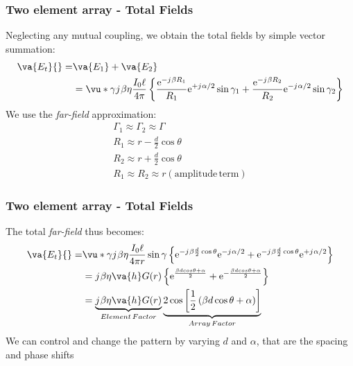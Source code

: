 \documentclass[10pt]{beamer}
\newcommand{\e}{\mathrm{e}} %
\renewcommand{\j}{{j}\mkern1mu} %
\begin{document}
\begin{frame}
    \frametitle{Two element array - Total Fields}
Neglecting any mutual coupling, we obtain the total fields by simple vector summation:
\begin{align*}
    \va{E_t} {}=& \va{E_1} + \va{E_2} \\
    &= \vu*{\gamma} \j \beta \eta \frac{I_{0} \ell}{4 \pi}\left\{\frac{\e^{-\j \beta R_{1}}}{R_{1}} \e^{+\j \alpha / 2} \sin \gamma_{1}+\frac{\e^{-\j \beta R_{2}}}{R_{2}} \e^{-\j \alpha / 2} \sin \gamma_{2}\right\}
 \end{align*}
    We use the \textit{far-field} approximation:
    \begin{align*}
        \Gamma_1 \approx \Gamma_2 \approx \Gamma \\
        R_1 \approx r - \frac{d}{2} \cos \theta \\
        R_2 \approx r + \frac{d}{2} \cos \theta \\
       R_1 \approx R_2 \approx r (\mathrm{amplitude \, term})
    \end{align*}
\end{frame}

\begin{frame}
    \frametitle{Two element array - Total Fields}

    The total \textit{far-field} thus becomes:
    \begin{align*}
        \va{E_t} {}=& \vu*{\gamma} \j \beta \eta \frac{I_{0} \ell}{4 \pi r} \sin \gamma \left\{\e^{-\j \beta \frac{d}{2}\cos \theta } \e^{- \j \alpha / 2} + \e^{-\j \beta \frac{d}{2}\cos \theta } \e^{+\j \alpha / 2}\right\} \\
        &= \j \beta \eta \va{h} G(r) \left\{ \e^{\frac{\beta d cos \theta + \alpha}{2}} + \e^{-\frac{\beta d cos \theta + \alpha}{2}}\right\} \\
        &= \underbrace{\j \beta \eta \va{h} G(r)}_{Element \, Factor} \underbrace{2 \cos \left[\frac{1}{2}\left(\beta d \cos \theta + \alpha\right)\right]}_{Array \, Factor}
    \end{align*}
We can control and change the pattern by varying $d$ and $\alpha$, that are the spacing and phase shifts
\end{frame}




\end{document}
